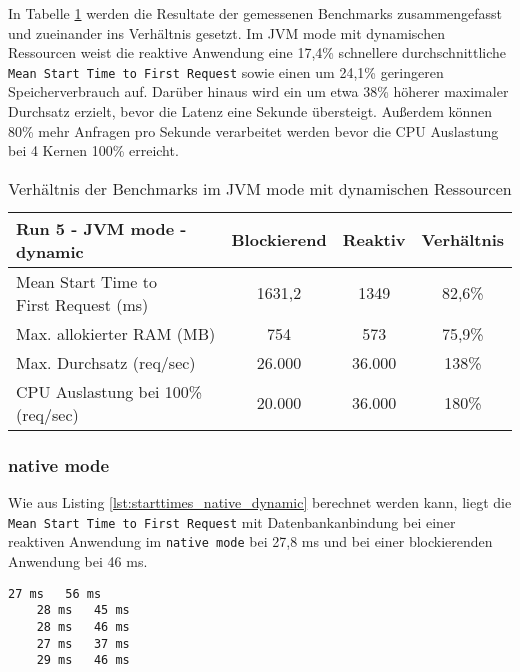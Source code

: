 In Tabelle \ref{table:dynamic_jvm_measurement_results} werden die Resultate der gemessenen Benchmarks zusammengefasst
und zueinander ins Verhältnis gesetzt. Im JVM mode mit dynamischen Ressourcen weist die reaktive Anwendung
eine 17,4\% schnellere durchschnittliche \verb|Mean Start Time to First Request| sowie
einen um 24,1\% geringeren Speicherverbrauch auf.
Darüber hinaus wird ein um etwa 38\% höherer maximaler Durchsatz erzielt, bevor die Latenz eine Sekunde übersteigt.
Außerdem können 80\% mehr Anfragen pro Sekunde verarbeitet werden bevor die CPU Auslastung bei 4 Kernen 100\% erreicht.

\begin{table}[ht!]
  \begin{tabular}{|l | c | c | c|}
    \hline
    Run 5 - JVM mode - dynamic & Blockierend & Reaktiv & Verhältnis \\
    \hline
    \makecell[l]{Mean Start Time to                                 \\ First Request (ms)} &   1631,2    &  1349  &   82,6\%   \\
    \hline
    Max. allokierter RAM (MB)  & 754         & 573     & 75,9\%     \\
    \hline
    Max. Durchsatz (req/sec)   & 26.000      & 36.000  & 138\%      \\
    \hline
    \makecell[l]{CPU Auslastung bei 100\%                           \\ (req/sec)} & 20.000 & 36.000 & 180\%  \\
    \hline
  \end{tabular}
  \caption{Verhältnis der Benchmarks im JVM mode mit dynamischen Ressourcen}
  \label{table:dynamic_jvm_measurement_results}
\end{table}

\newpage
\subsubsection{native mode}
\label{subsubsec:dynamic_native_mode}
Wie aus Listing \ref{lst:starttimes_native_dynamic} berechnet werden kann, liegt die \verb|Mean Start Time to First Request|
mit Datenbankanbindung bei einer reaktiven Anwendung im \verb|native mode| bei 27,8 ms und bei
einer blockierenden Anwendung bei 46 ms.

\begin{lstlisting}[caption=Startzeiten im JVM mode mit dynamischen Ressourcen, captionpos=b, label=lst:starttimes_native_dynamic]
    27 ms   56 ms
    28 ms   45 ms
    28 ms   46 ms
    27 ms   37 ms
    29 ms   46 ms
\end{lstlisting}

